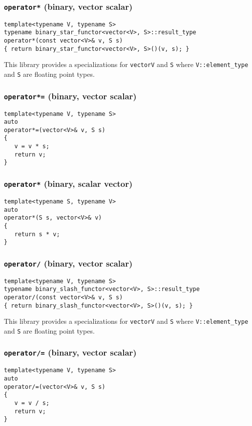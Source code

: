 \documentclass[oneside]{book}
\begin{document}
\subsubsection{\texttt{operator*} (binary, vector scalar)}
\begin{verbatim}
template<typename V, typename S>
typename binary_star_functor<vector<V>, S>::result_type
operator*(const vector<V>& v, S s)
{ return binary_star_functor<vector<V>, S>()(v, s); }
\end{verbatim}
This library provides a specializations for \texttt{vector\textlangle V\textrangle}
and \texttt{S} where    \texttt{V::element\_type} and \texttt{S} are floating point
types.

\subsubsection{\texttt{operator*=} (binary, vector scalar)}
\begin{verbatim}
template<typename V, typename S>
auto
operator*=(vector<V>& v, S s)
{
   v = v * s;
   return v;
}
\end{verbatim}

\subsubsection{\texttt{operator*} (binary, scalar vector)}
\begin{verbatim}
template<typename S, typename V>
auto
operator*(S s, vector<V>& v)
{
   return s * v;
}
\end{verbatim}

\subsubsection{\texttt{operator/} (binary, vector scalar)}
\begin{verbatim}
template<typename V, typename S>
typename binary_slash_functor<vector<V>, S>::result_type
operator/(const vector<V>& v, S s)
{ return binary_slash_functor<vector<V>, S>()(v, s); }
\end{verbatim}
This library provides a specializations for \texttt{vector\textlangle V\textrangle}
and \texttt{S} where    \texttt{V::element\_type} and \texttt{S} are floating point
types.

\subsubsection{\texttt{operator/=} (binary, vector scalar)}
\begin{verbatim}
template<typename V, typename S>
auto
operator/=(vector<V>& v, S s)
{
   v = v / s;
   return v;
}
\end{verbatim}
\end{document}

